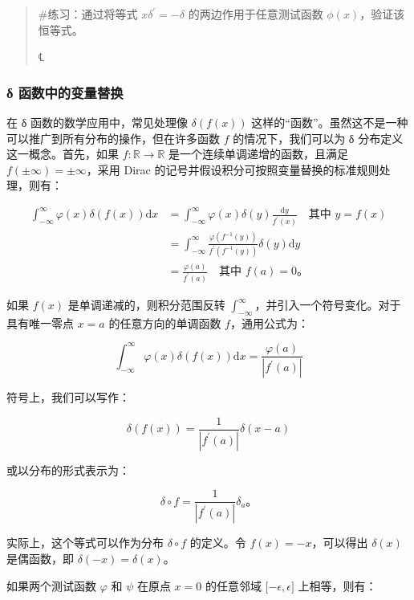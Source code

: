 \begin{quote}
\#练习：通过将等式 \(x\delta^{\prime} = - \delta\)
的两边作用于任意测试函数 \(\phi(x)\)，验证该恒等式。

℄~
\end{quote}

\subsubsection{δ
函数中的变量替换}\label{ux3b4-ux51fdux6570ux4e2dux7684ux53d8ux91cfux66ffux6362}

在 δ 函数的数学应用中，常见处理像 \(\delta\left( f(x) \right)\)
这样的``函数''。虽然这不是一种可以推广到所有分布的操作，但在许多函数
\(f\) 的情况下，我们可以为 δ 分布定义这一概念。首先，如果
\(f:\mathbb{R} \rightarrow \mathbb{R}\) 是一个连续单调递增的函数，且满足
\(f( \pm \infty) = \pm \infty\)，采用 Dirac
的记号并假设积分可按照变量替换的标准规则处理，则有：

\[\begin{aligned}
\int_{- \infty}^{\infty}\varphi(x)\delta\left( f(x) \right)\mathrm{d}x & = \int_{- \infty}^{\infty}\varphi(x)\delta(y)\frac{\mathrm{d}y}{f^{\prime}(x)}\quad\mathrm{\text{其中 }}y = f(x) \\
 & = \int_{- \infty}^{\infty}\frac{\varphi\left( f^{- 1}(y) \right)}{f^{\prime}\left( f^{- 1}(y) \right)}\delta(y)\mathrm{d}y \\
 & = \frac{\varphi(a)}{f^{\prime}(a)}\quad\mathrm{\text{其中 }}f(a) = 0。
\end{aligned}\]

如果 \(f(x)\) 是单调递减的，则积分范围反转
\(\int_{- \infty}^{\infty}\)，并引入一个符号变化。对于具有唯一零点
\(x = a\) 的任意方向的单调函数 \(f\)，通用公式为：

\[\int_{- \infty}^{\infty}\varphi(x)\delta\left( f(x) \right)\mathrm{d}x = \frac{\varphi(a)}{\left| f^{\prime}(a) \right|}\]

符号上，我们可以写作：

\[\delta\left( f(x) \right) = \frac{1}{\left| f^{\prime}(a) \right|}\delta(x - a)\]

或以分布的形式表示为：

\[\delta \circ f = \frac{1}{\left| f^{\prime}(a) \right|}\delta_{a}。\]

实际上，这个等式可以作为分布 \(\delta \circ f\) 的定义。令
\(f(x) = - x\)，可以得出 \(\delta(x)\) 是偶函数，即
\(\delta( - x) = \delta(x)\)。

如果两个测试函数 \(\varphi\) 和 \(\psi\) 在原点 \(x = 0\) 的任意邻域
\(\lbrack - \epsilon,\epsilon\rbrack\) 上相等，则有：

